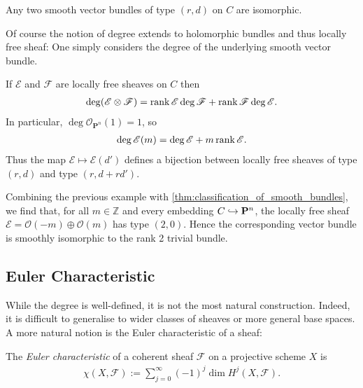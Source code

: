 \documentclass[12pt]{ociamthesis}  %
\begin{document}
\begin{theorem}\label{thm:classification_of_smooth_bundles}
  Any two smooth vector bundles of type $(r,d)$ on $C$
  are isomorphic.
\end{theorem}

Of course the notion of degree extends to holomorphic bundles
and thus locally free sheaf: One simply considers the degree of
the underlying smooth vector bundle.

\begin{example}
  If $\mathscr E$ and $\mathscr F$ are locally free sheaves on $C$ then
  \begin{align}\label{eq:degree_of_tensor}
    \deg(\mathscr E\otimes\mathscr F) = \operatorname{rank}\mathscr E\deg\mathscr F + \operatorname{rank}\mathscr F\deg\mathscr E.
  \end{align}
  In particular, $\deg \mathscr O_{\mathbf P^n}(1) = 1$, so
  \begin{align*}
    \deg \mathscr E(m) = \deg\mathscr E + m\operatorname{rank}\mathscr E.
  \end{align*}
  Thus the map $\mathscr E \mapsto \mathscr E(d')$ defines
  a bijection between locally free sheaves of type $(r,d)$ and
  type $(r,d+rd')$.
\end{example}

\begin{example}
  Combining the previous example with \ref{thm:classification_of_smooth_bundles},
  we find that, for all $m\in\mathbb Z$ and every embedding
  $C\hookrightarrow\mathbf P^n$, the locally free sheaf
  $\mathscr E = \mathscr O(-m)\oplus\mathscr O(m)$ has type $(2,0)$.
  Hence the corresponding vector bundle is
  smoothly isomorphic to the rank 2 trivial bundle.
\end{example}

\subsection{Euler Characteristic}

While the degree is well-defined, it is not the most natural construction.
Indeed, it is difficult to generalise to wider classes of
sheaves or more general base spaces. A more natural notion is
the Euler characteristic of a sheaf:

\begin{definition}
  The \emph{Euler characteristic} of a coherent sheaf $\mathscr F$
  on a projective scheme $X$ is
  \begin{align*}
    \chi (X,\mathscr F) := \sum_{j=0}^\infty (-1)^j \dim H^j (X,\mathscr F).
  \end{align*}
\end{definition}
\end{document}
